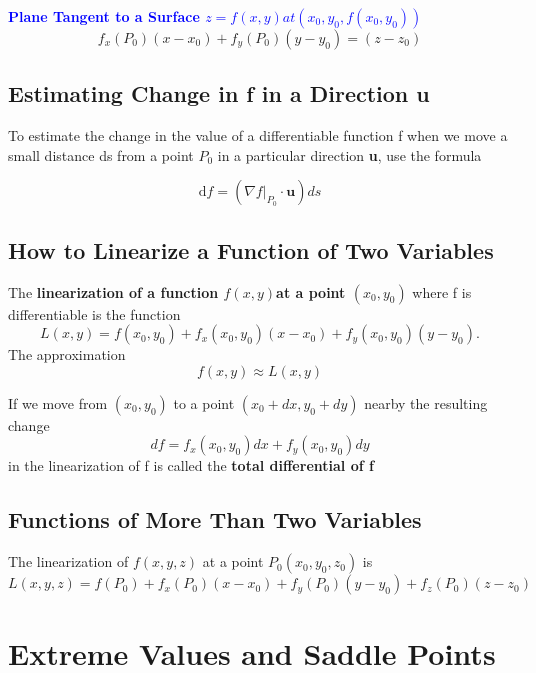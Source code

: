\documentclass[12pt,a4paper,draft]{article}
\newenvironment{definition}{\begin{definitionbox}}{\end{definitionbox}\vspace{1\baselineskip}}
\newenvironment{mynote}{\vspace{1\baselineskip}\begin{note}}{\end{note}\vspace{1\baselineskip}}
\newcommand{\fxy}{\(f(x,y)\)}
\begin{document}
\begin{mynote}
    \textcolor{blue}{\textbf{Plane Tangent to a Surface \(z = f(x,y) at (x_0,y_0,f(x_0,y_0))\)}}
    \[f_x(P_0)(x-x_0) + f_y(P_0)(y-y_0) = (z-z_0)\]

\end{mynote}

\subsection{Estimating Change in f in a Direction u }

\begin{mynote}
    To estimate the change in the value of a differentiable function f when we move a small distance ds from a point \(P_0\) in a particular direction \textbf{u}, use the formula

    \[\mathrm{d}f = (\nabla f|_{P_0} \cdot \mathbf{u}) ds\]

\end{mynote}


\subsection{How to Linearize a Function of Two Variables }

\begin{definition}
    The \textbf{linearization of a function \fxy at a point \((x_0,y_0)\)} where f is differentiable is the function
    \[L(x,y) = f(x_0,y_0) + f_x(x_0,y_0)(x-x_0) + f_y(x_0,y_0)(y-y_0).\]
    The approximation
    \[f(x,y) \approx L(x,y)\]
\end{definition}

\begin{definition}
    If we move from \((x_0,y_0)\) to a point \((x_0 + dx, y_0+ dy)\) nearby the resulting change 
    \[df = f_x(x_0,y_0)dx + f_y(x_0,y_0) dy\]
    in the linearization of f is called the \textbf{total differential of f}
\end{definition}

\subsection{Functions of More Than Two Variables}

The linearization of \(f(x,y,z)\) at a point \(P_0(x_0,y_0,z_0)\) is 
\[L(x,y,z) = f(P_0) + f_x(P_0)(x-x_0) + f_y(P_0)(y-y_0) + f_z(P_0)(z-z_0)\]


\section{Extreme Values and Saddle Points}
\end{document}
